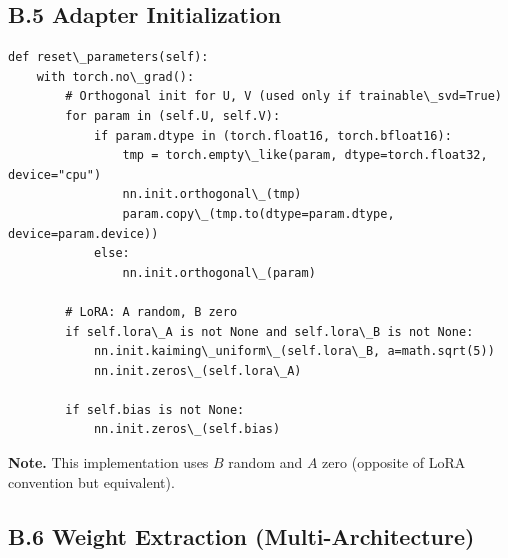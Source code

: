 \subsection{B.5 Adapter Initialization}

\begin{lstlisting}
def reset\_parameters(self):
    with torch.no\_grad():
        # Orthogonal init for U, V (used only if trainable\_svd=True)
        for param in (self.U, self.V):
            if param.dtype in (torch.float16, torch.bfloat16):
                tmp = torch.empty\_like(param, dtype=torch.float32, device="cpu")
                nn.init.orthogonal\_(tmp)
                param.copy\_(tmp.to(dtype=param.dtype, device=param.device))
            else:
                nn.init.orthogonal\_(param)
        
        # LoRA: A random, B zero
        if self.lora\_A is not None and self.lora\_B is not None:
            nn.init.kaiming\_uniform\_(self.lora\_B, a=math.sqrt(5))
            nn.init.zeros\_(self.lora\_A)
        
        if self.bias is not None:
            nn.init.zeros\_(self.bias)
\end{lstlisting}

\textbf{Note.} This implementation uses $B$ random and $A$ zero (opposite of LoRA 
convention but equivalent).

\subsection{B.6 Weight Extraction (Multi-Architecture)}

